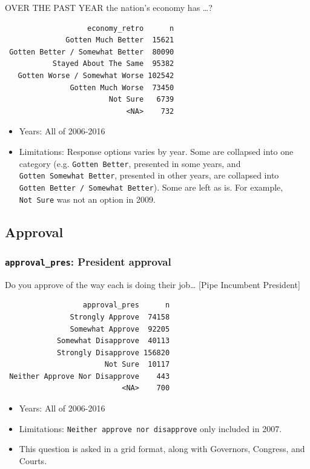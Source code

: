 \documentclass[10pt,article,oneside]{memoir}
\theoremstyle{definition}
\begin{document}
OVER THE PAST YEAR the nation's economy has \ldots{}?

\begin{verbatim}
                   economy_retro      n
              Gotten Much Better  15621
 Gotten Better / Somewhat Better  80090
           Stayed About The Same  95382
   Gotten Worse / Somewhat Worse 102542
               Gotten Much Worse  73450
                        Not Sure   6739
                            <NA>    732
\end{verbatim}

\begin{itemize}
\tightlist
\item
  Years: All of 2006-2016
\item
  Limitations: Response options varies by year. Some are collapsed into
  one category (e.g. \texttt{Gotten\ Better}, presented in some years,
  and \texttt{Gotten\ Somewhat\ Better}, presented in other years, are
  collapsed into \texttt{Gotten\ Better\ /\ Somewhat\ Better}). Some are
  left as is. For example, \texttt{Not\ Sure} was not an option in 2009.
\end{itemize}

\subsection{Approval}\label{approval}

\subsubsection{\texorpdfstring{\texttt{approval\_pres}: President
approval}{approval\_pres: President approval}}\label{approval_pres-president-approval}

Do you approve of the way each is doing their job\ldots{} {[}Pipe
Incumbent President{]}

\begin{verbatim}
                  approval_pres      n
               Strongly Approve  74158
               Somewhat Approve  92205
            Somewhat Disapprove  40113
            Strongly Disapprove 156820
                       Not Sure  10117
 Neither Approve Nor Disapprove    443
                           <NA>    700
\end{verbatim}

\begin{itemize}
\tightlist
\item
  Years: All of 2006-2016
\item
  Limitations: \texttt{Neither\ approve\ nor\ disapprove} only included
  in 2007.
\item
  This question is asked in a grid format, along with Governors,
  Congress, and Courts.
\end{itemize}
\end{document}
